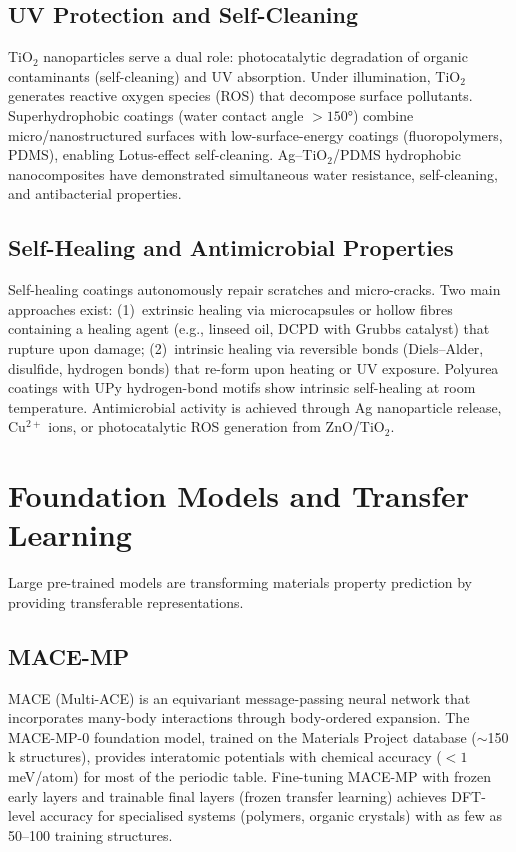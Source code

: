 \documentclass[11pt,a4paper]{article}
\begin{document}
\subsection{UV Protection and Self-Cleaning}

TiO$_2$ nanoparticles serve a dual role: photocatalytic degradation of organic contaminants (self-cleaning) and UV absorption.
Under illumination, TiO$_2$ generates reactive oxygen species (ROS) that decompose surface pollutants.
Superhydrophobic coatings (water contact angle $> 150°$) combine micro/nanostructured surfaces with low-surface-energy coatings (fluoropolymers, PDMS), enabling Lotus-effect self-cleaning.
Ag--TiO$_2$/PDMS hydrophobic nanocomposites have demonstrated simultaneous water resistance, self-cleaning, and antibacterial properties.

\subsection{Self-Healing and Antimicrobial Properties}

Self-healing coatings autonomously repair scratches and micro-cracks.
Two main approaches exist: (1)~extrinsic healing via microcapsules or hollow fibres containing a healing agent (e.g., linseed oil, DCPD with Grubbs catalyst) that rupture upon damage; (2)~intrinsic healing via reversible bonds (Diels--Alder, disulfide, hydrogen bonds) that re-form upon heating or UV exposure.
Polyurea coatings with UPy hydrogen-bond motifs show intrinsic self-healing at room temperature.
Antimicrobial activity is achieved through Ag nanoparticle release, Cu$^{2+}$ ions, or photocatalytic ROS generation from ZnO/TiO$_2$.

\section{Foundation Models and Transfer Learning}
\label{sec:foundation}

Large pre-trained models are transforming materials property prediction by providing transferable representations.

\subsection{MACE-MP}

MACE (Multi-ACE) is an equivariant message-passing neural network that incorporates many-body interactions through body-ordered expansion.
The MACE-MP-0 foundation model, trained on the Materials Project database ($\sim$150\,k structures), provides interatomic potentials with chemical accuracy ($< 1$\,meV/atom) for most of the periodic table.
Fine-tuning MACE-MP with frozen early layers and trainable final layers (frozen transfer learning) achieves DFT-level accuracy for specialised systems (polymers, organic crystals) with as few as 50--100 training structures.
\end{document}
